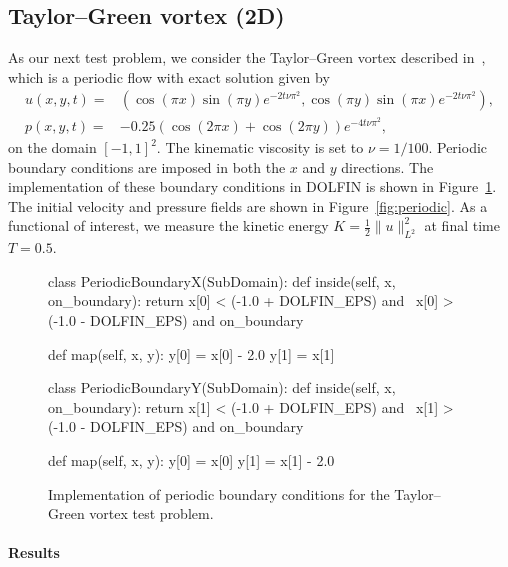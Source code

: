 \subsection{Taylor--Green vortex (2D)}

As our next test problem, we consider the Taylor--Green vortex
described in~\cite{Canuto07}, which is a periodic flow with exact
solution given by
\begin{equation}\label{eq:periodic}
  \begin{split}
    u(x,y,t) = & (\cos (\pi x) \sin (\pi y)  e^{-2t\nu\pi^2}, \cos (\pi y)  \sin (\pi x)  e^{-2t\nu\pi^2}), \\
    p(x,y,t) = & -0.25(\cos(2\pi x ) + \cos(2\pi y ))  e^{-4t\nu\pi^2},
  \end{split}
\end{equation}
on the domain $[-1, 1]^{2}$. The kinematic viscosity is set to $\nu =
1/100$. Periodic boundary conditions are imposed in both the $x$ and
$y$ directions. The implementation of these boundary conditions in
DOLFIN is shown in Figure~\ref{fig:periodic_bcs}. The initial velocity
and pressure fields are shown in Figure~\ref{fig:periodic}. As a
functional of interest, we measure the kinetic energy $K = \frac{1}{2}
\|u\|^2_{L^2}$ at final time $T = 0.5$.

\begin{figure}[htbp]
  \begin{center}
    \begin{python}
class PeriodicBoundaryX(SubDomain):
    def inside(self, x, on_boundary):
        return x[0] < (-1.0 + DOLFIN_EPS) and \
               x[0] > (-1.0 - DOLFIN_EPS) and on_boundary

    def map(self, x, y):
        y[0] = x[0] - 2.0
        y[1] = x[1]

class PeriodicBoundaryY(SubDomain):
    def inside(self, x, on_boundary):
        return x[1] < (-1.0 + DOLFIN_EPS) and \
               x[1] > (-1.0 - DOLFIN_EPS) and on_boundary

    def map(self, x, y):
        y[0] = x[0]
        y[1] = x[1] - 2.0
    \end{python}
    \caption{Implementation of periodic boundary conditions for the
      Taylor--Green vortex test problem.}
    \label{fig:periodic_bcs}
  \end{center}
\end{figure}

\paragraph{Results}

